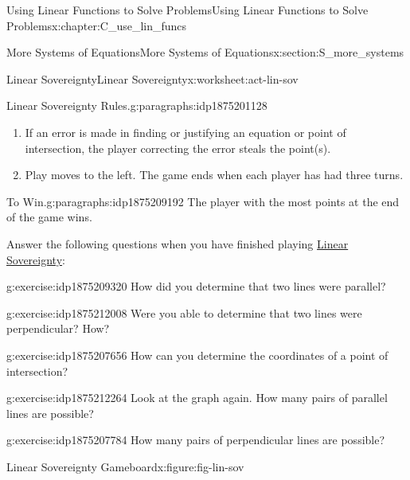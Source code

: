 \documentclass[oneside,10pt,]{book}
\numberwithin{equation}{chapter}
\begin{document}
\begin{chapterptx}{Using Linear Functions to Solve Problems}{}{Using Linear Functions to Solve Problems}{}{}{x:chapter:C_use_lin_funcs}
\begin{sectionptx}{More Systems of Equations}{}{More Systems of Equations}{}{}{x:section:S_more_systems}
\begin{worksheet-subsection}{Linear Sovereignty}{}{Linear Sovereignty}{}{}{x:worksheet:act-lin-sov}
\begin{paragraphs}{Linear Sovereignty Rules.}{g:paragraphs:idp1875201128}
\begin{enumerate}[label=(\alph*)]
\begin{itemize}[label=\textbullet]
\item{}1 point for constructing a line parallel or perpendicular to an existing line.%
\end{itemize}
%
\item{}If an error is made in finding or justifying an equation or point of intersection, the player correcting the error steals the point(s).%
\item{}Play moves to the left. The game ends when each player has had three turns.%
\end{enumerate}
%
\end{paragraphs}%
\begin{paragraphs}{To Win.}{g:paragraphs:idp1875209192}%
The player with the most points at the end of the game wins.%
\end{paragraphs}%
\par
Answer the following questions when you have finished playing \hyperref[x:worksheet:act-lin-sov]{Linear Sovereignty}:%
\begin{divisionexercise}{1}{}{}{g:exercise:idp1875209320}%
How did you determine that two lines were parallel?%
\end{divisionexercise}%
\begin{divisionexercise}{2}{}{}{g:exercise:idp1875212008}%
Were you able to determine that two lines were perpendicular? How?%
\end{divisionexercise}%
\begin{divisionexercise}{3}{}{}{g:exercise:idp1875207656}%
How can you determine the coordinates of a point of intersection?%
\end{divisionexercise}%
\begin{divisionexercise}{4}{}{}{g:exercise:idp1875212264}%
Look at the graph again. How many pairs of parallel lines are possible?%
\end{divisionexercise}%
\begin{divisionexercise}{5}{}{}{g:exercise:idp1875207784}%
How many pairs of perpendicular lines are possible?%
\end{divisionexercise}%
\clearpage
\begin{figureptx}{Linear Sovereignty Gameboard}{x:figure:fig-lin-sov}{}%
\begin{image}{0}{1}{0}%

\end{image}
\end{figureptx}
\end{worksheet-subsection}
\end{sectionptx}
\end{chapterptx}
\end{document}
